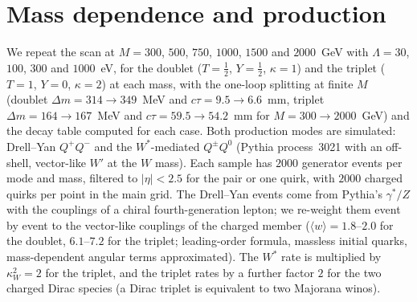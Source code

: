\documentclass[prd,twocolumn,nofootinbib,superscriptaddress,amsmath,amssymb]{revtex4-2}
\begin{document}
\section{Mass dependence and production}\label{sec:mass}
We repeat the scan at $M=300$, $500$, $750$, $1000$, $1500$ and $2000$~GeV with $\Lambda=30$, $100$, $300$ and $1000$~eV, for the doublet ($T=\tfrac12$, $Y=\tfrac12$, $\kappa=1$) and the triplet ($T=1$, $Y=0$, $\kappa=2$) at each mass, with the one-loop splitting at finite $M$ (doublet $\Delta m=314\to349$~MeV and $c\tau=9.5\to6.6$~mm, triplet $\Delta m=164\to167$~MeV and $c\tau=59.5\to54.2$~mm for $M=300\to2000$~GeV) and the decay table computed for each case. Both production modes are simulated: Drell--Yan $Q^+Q^-$ and the $W^*$-mediated $Q^\pm Q^0$ (Pythia process~3021 with an off-shell, vector-like $W'$ at the $W$ mass). Each sample has $2000$ generator events per mode and mass, filtered to $|\eta|<2.5$ for the pair or one quirk, with $2000$ charged quirks per point in the main grid. The Drell--Yan events come from Pythia's $\gamma^*/Z$ with the couplings of a chiral fourth-generation lepton; we re-weight them event by event to the vector-like couplings of the charged member ($\langle w\rangle=1.8$--$2.0$ for the doublet, $6.1$--$7.2$ for the triplet; leading-order formula, massless initial quarks, mass-dependent angular terms approximated). The $W^*$ rate is multiplied by $\kappa_W^2=2$ for the triplet, and the triplet rates by a further factor $2$ for the two charged Dirac species (a Dirac triplet is equivalent to two Majorana winos).
\end{document}
